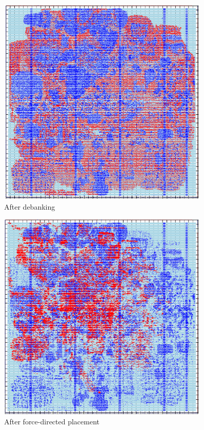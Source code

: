 \documentclass[12pt]{article}
\begin{document}
\begin{figure}[htbp]
    \centering
    \includegraphics[width=0.9\textwidth]{results/debank.png}
    \caption{After debanking}
\end{figure}

\begin{figure}[htbp]
    \centering
    \includegraphics[width=0.9\textwidth]{results/force1.png}
    \caption{After force-directed placement}
    \label{fig:force1}
\end{figure}
\end{document}
